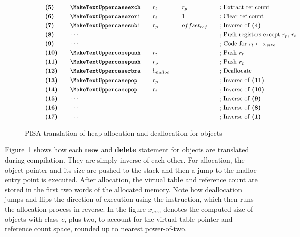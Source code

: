 \begin{figure}[H]
\begin{subfigure}[t]{0.495\linewidth}
{\begin{minipage}{\linewidth}
\begin{alignat*}{5}
                    &\textbf{(5)}\quad&&\inst{exch}\quad && r_t\quad && r_p\quad &&\text{; Extract ref count}\\
                    &\textbf{(6)}\quad&&\inst{xori}\quad && r_t\quad && 1 &&\text{; Clear ref count}\\
                    &\textbf{(7)}\quad&&\inst{subi}\quad && r_p\quad && offset_{ref}\quad &&\text{; Inverse of \textbf{(4)}}\\
                    &\textbf{(8)}\quad&&\cdots \quad &&\quad && \quad &&\text{; Push registers except $r_p$, $r_t$ }\\
                    &\textbf{(9)}\quad&&\cdots\quad &&\quad && &&\text{; Code for $r_t \leftarrow x_{size}$}\\
                    &\textbf{(10)}\quad&&\inst{push}\quad && r_t \quad && &&\text{; Push $r_t$}\\
                    &\textbf{(11)}\quad&&\inst{push}\quad && r_p \quad && &&\text{; Push $r_p$}\\
                    &\textbf{(12)}\quad&&\inst{rbra}\quad && l_{malloc} \quad && &&\text{; Deallocate}\\
                    &\textbf{(13)}\quad&&\inst{pop}\quad && r_p \quad && &&\text{; Inverse of \textbf{(11)}}\\
                    &\textbf{(14)}\quad&&\inst{pop}\quad && r_t \quad && &&\text{; Inverse of \textbf{(10)}}\\
                    &\textbf{(15)}\quad&&\cdots\quad &&\quad && &&\text{; Inverse of \textbf{(9)}}\\
                    &\textbf{(16)}\quad&&\cdots\quad && \quad && &&\text{; Inverse of \textbf{(8)}}\\
                    &\textbf{(17)}\quad&&\cdots\quad && \quad && &&\text{; Inverse of \textbf{(1)}}\\
                \end{alignat*}
            \end{minipage}
        }
    \end{subfigure}
    \caption{PISA translation of heap allocation and deallocation for objects}
    \label{fig:pisa-allocation-deallocation}
\end{figure}
\clearpage

Figure~\ref{fig:pisa-allocation-deallocation} shows how each \textbf{new} and \textbf{delete} statement for objects are translated during compilation. They are simply inverse of each other. For allocation, the object pointer and its size are pushed to the stack and then a jump to the malloc entry point is executed. After allocation, the virtual table and reference count are stored in the first two words of the allocated memory. Note how deallocation jumps and flips the direction of execution using the  instruction, which then runs the allocation process in reverse. In the figure $x_{size}$ denotes the computed size of objects with class $c$, plus two, to account for the virtual table pointer and reference count space, rounded up to nearest power-of-two.

